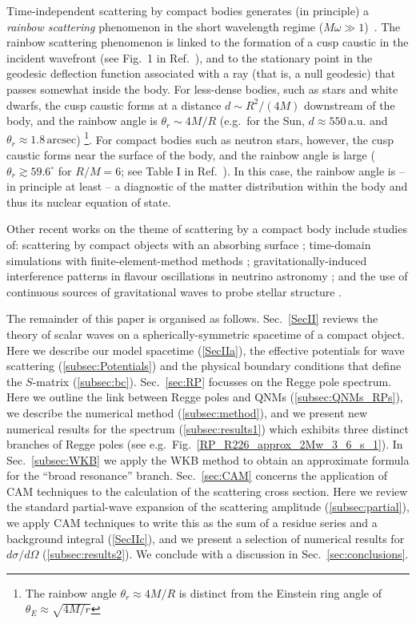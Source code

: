 \documentclass[aps,prd,longbibliography,reprint,twocolumn,amsmath,amssymb,amsfonts,showpacs,footnote,superscriptaddress]{revtex4-1}%
\begin{document}
Time-independent scattering by compact bodies generates (in principle) a \emph{rainbow scattering} phenomenon in the short wavelength regime ($M \omega \gg 1$)~\cite{Dolan:2017rtj, Stratton:2019deq}. The rainbow scattering phenomenon is linked to the formation of a cusp caustic in the incident wavefront (see Fig.~1 in Ref.~\cite{Stratton:2019deq}), and to the stationary point in the geodesic deflection function associated with a ray (that is, a null geodesic) that passes somewhat inside the body. For less-dense bodies, such as stars and white dwarfs, the cusp caustic forms at a distance $d \sim R^2 / (4M)$ downstream of the body, and the rainbow angle is $\theta_r \sim 4M/R$ (e.g.~for the Sun, $d \approx 550 \, \text{a.u.}$ and $\theta_r \approx 1.8 \, \text{arcsec}$) \footnote{The rainbow angle $\theta_r \approx 4M/R$ is distinct from the Einstein ring angle of $\theta_E \approx \sqrt{4M/r}$}. For compact bodies such as neutron stars, however, the cusp caustic forms near the surface of the body, and the rainbow angle is large ($\theta_r \gtrsim 59.6^\circ$ for $R/M = 6$; see Table I in Ref.~\cite{Stratton:2019deq}). In this case, the rainbow angle is -- in principle at least -- a diagnostic of the matter distribution within the body and thus its nuclear equation of state.

Other recent works on the theme of scattering by a compact body include studies of: scattering by compact objects with an absorbing surface \cite{Nambu:2019sqn}; time-domain simulations with finite-element-method methods \cite{He:2019orl}; gravitationally-induced interference patterns in flavour oscillations in neutrino astronomy \cite{Alexandre:2018crg}; and the use of continuous sources of gravitational waves to probe stellar structure \cite{Marchant:2019swq}.

The remainder of this paper is organised as follows. Sec.~\ref{SecII} reviews the theory of scalar waves on a spherically-symmetric spacetime of a compact object. Here we describe our model spacetime (\ref{SecIIa}), the effective potentials for wave scattering (\ref{subsec:Potentials}) and the physical boundary conditions that define the $S$-matrix (\ref{subsec:bc}). Sec.~\ref{sec:RP} focusses on the Regge pole spectrum. Here we outline the link between Regge poles and QNMs (\ref{subsec:QNMs_RPs}), we describe the numerical method (\ref{subsec:method}), and we present new numerical results for the spectrum (\ref{subsec:results1}) which exhibits three distinct branches of Regge poles (see e.g.~Fig.~\ref{RP_R226_approx_2Mw_3_6_s_1}). In Sec.~\ref{subsec:WKB} we apply the WKB method to obtain an approximate formula for the ``broad resonance'' branch. Sec.~\ref{sec:CAM} concerns the application of CAM techniques to the calculation of the scattering cross section. Here we review the standard partial-wave expansion of the scattering amplitude (\ref{subsec:partial}), we apply CAM techniques to write this as the sum of a residue series and a background integral (\ref{SecIIc}), and we present a selection of numerical results for $d\sigma/d\Omega$ (\ref{subsec:results2}). We conclude with a discussion in Sec.~\ref{sec:conclusions}.
\end{document}
